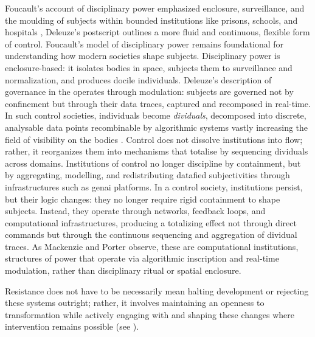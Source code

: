 Foucault’s account of disciplinary power emphasized enclosure, surveillance, and the moulding of subjects within bounded institutions like prisons, schools, and hospitals \parencite{foucault2008}, Deleuze's postscript outlines a more fluid and continuous, flexible form of control. Foucault’s model of disciplinary power remains foundational for understanding how modern societies shape subjects. Disciplinary power is enclosure-based: it isolates bodies in space, subjects them to surveillance and normalization, and produces docile individuals. Deleuze's description of governance in the  operates through modulation: subjects are governed not by confinement but through their data traces, captured and recomposed in real-time.
In such control societies, individuals become \emph{dividuals}, decomposed into discrete, analysable data points recombinable by algorithmic systems \parencite{mackenzie2021} vastly increasing the field of visibility on the bodies \parencite{foucault2008}. Control does not dissolve institutions into flow; rather, it reorganizes them into mechanisms that totalise by sequencing dividuals across domains. Institutions of control no longer discipline by containment, but by aggregating, modelling, and redistributing datafied subjectivities through infrastructures such as \gls{genai} platforms. In a control society, institutions persist, but their logic changes: they no longer require rigid containment to shape subjects. Instead, they operate through networks, feedback loops, and computational infrastructures, producing a totalizing effect not through direct commands but through the continuous sequencing and aggregation of dividual traces. As Mackenzie and Porter \parencite*[]{mackenzie2021} observe, these are computational institutions, structures of power that operate via algorithmic inscription and real-time modulation, rather than disciplinary ritual or spatial enclosure.

Resistance does not have to be necessarily mean halting development or rejecting these systems outright; rather, it involves maintaining an openness to transformation while actively engaging with and shaping these changes where intervention remains possible (see \cite[227]{tucker2021}).

